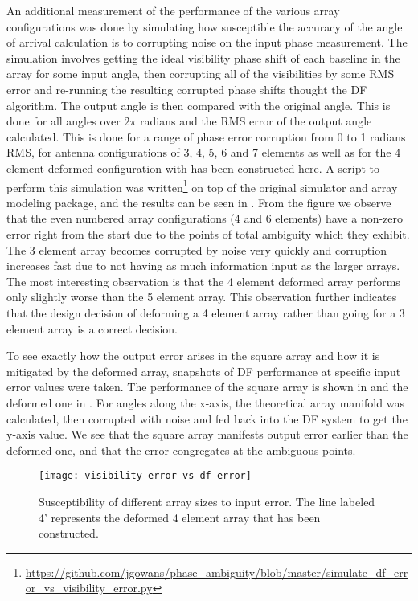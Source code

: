 An additional measurement of the performance of the various array configurations was done by simulating how susceptible the accuracy of the angle of arrival calculation is to corrupting noise on the input phase measurement. The simulation involves getting the ideal visibility phase shift of each baseline in the array for some input angle, then corrupting all of the visibilities by some RMS error and re-running the resulting corrupted phase shifts thought the DF algorithm. The output angle is then compared with the original angle. This is done for all angles over \(2\pi\) radians and the RMS error of the output angle calculated. This is done for a range of phase error corruption from 0 to 1 radians RMS, for antenna configurations of 3, 4, 5, 6 and 7 elements as well as for the 4 element deformed configuration with has been constructed here. A script to perform this simulation was written\footnote{\url{https://github.com/jgowans/phase_ambiguity/blob/master/simulate_df_error_vs_visibility_error.py}} on top of the original simulator and array modeling package, and the results can be seen in . From the figure we observe that the even numbered array configurations (4 and 6 elements) have a non-zero error right from the start due to the points of total ambiguity which they exhibit. The 3 element array becomes corrupted by noise very quickly and corruption increases fast due to not having as much information input as the larger arrays. The most interesting observation is that the 4 element deformed array performs only slightly worse than the 5 element array. This observation further indicates that the design decision of deforming a 4 element array rather than going for a 3 element array is a correct decision.

To see exactly how the output error arises in the square array and how it is mitigated by the deformed array, snapshots of DF performance at specific input error values were taken. The performance of the square array is shown in  and the deformed one in . For angles along the x-axis, the theoretical array manifold was calculated, then corrupted with noise and fed back into the DF system to get the y-axis value. We see that the square array manifests output error earlier than the deformed one, and that the error congregates at the ambiguous points.

\begin{figure}
  \centering
  \texttt{[image: visibility-error-vs-df-error]}
  \caption{Susceptibility of different array sizes to input error. The line labeled 4' represents the deformed 4 element array that has been constructed.}
  \label{fig:antenna-array:configuration-vs-input-error-vs-output-error}
\end{figure}

